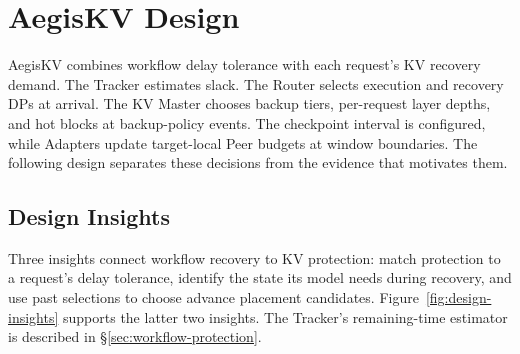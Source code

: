 \section{AegisKV Design}
\label{sec:design}

AegisKV combines workflow delay tolerance with each request's KV
recovery demand. The Tracker estimates slack. The Router selects execution
and recovery DPs at arrival. The KV Master chooses backup tiers,
per-request layer depths, and hot blocks at backup-policy events.
The checkpoint interval is configured, while Adapters update target-local
Peer budgets at window boundaries. The following design
separates these decisions from the evidence that motivates them.

\subsection{Design Insights}
\label{sec:design-insights}

Three insights connect workflow recovery to KV protection: match
protection to a request's delay tolerance, identify the state its model
needs during recovery, and use past selections to choose advance
placement candidates. Figure~\ref{fig:design-insights} supports the
latter two insights. The Tracker's remaining-time estimator is described
in \S\ref{sec:workflow-protection}.

